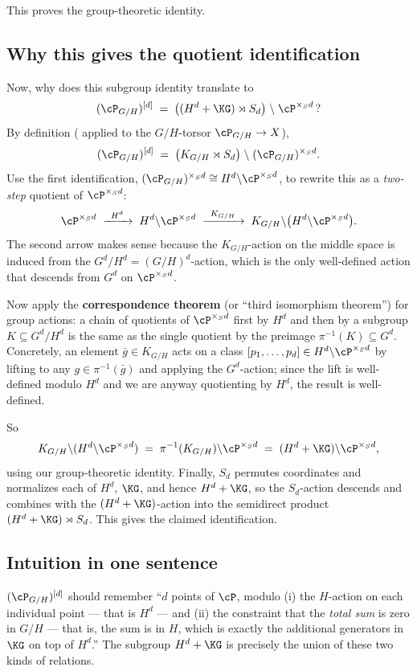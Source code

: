 This proves the group-theoretic identity.

\subsection*{Why this gives the quotient identification}
Now, why does this subgroup identity translate to
\[
(\cP_{G/H})^{[d]} \;=\; \bigl((H^d + \KG) \rtimes S_d\bigr) \;\backslash\; \cP^{\times_S d}\,?
\]
By definition ( applied to the $G/H$-torsor $\cP_{G/H}\to X$),
\[
(\cP_{G/H})^{[d]} \;=\; \bigl(K_{G/H} \rtimes S_d\bigr) \;\backslash\; (\cP_{G/H})^{\times_S d}.
\]
Use the first identification, $(\cP_{G/H})^{\times_S d} \cong H^d \backslash \cP^{\times_S d}$, to rewrite this as a \emph{two-step} quotient of $\cP^{\times_S d}$:
\[
\cP^{\times_S d} \;\xrightarrow{\;\;H^d\;\;}\; H^d \backslash \cP^{\times_S d} \;\xrightarrow{\;\;K_{G/H}\;\;}\; K_{G/H} \backslash \bigl(H^d \backslash \cP^{\times_S d}\bigr).
\]
The second arrow makes sense because the $K_{G/H}$-action on the middle space is induced from the $G^d/H^d = (G/H)^d$-action, which is the only well-defined action that descends from $G^d$ on $\cP^{\times_S d}$.

Now apply the \textbf{correspondence theorem} (or ``third isomorphism theorem'') for group actions: a chain of quotients of $\cP^{\times_S d}$ first by $H^d$ and then by a subgroup $K \subseteq G^d/H^d$ is the same as the single quotient by the preimage $\pi^{-1}(K) \subseteq G^d$. Concretely, an element $\bar g \in K_{G/H}$ acts on a class $[p_1,\dots,p_d] \in H^d \backslash \cP^{\times_S d}$ by lifting to any $g \in \pi^{-1}(\bar g)$ and applying the $G^d$-action; since the lift is well-defined modulo $H^d$ and we are anyway quotienting by $H^d$, the result is well-defined.

So
\[
K_{G/H} \backslash (H^d \backslash \cP^{\times_S d}) \;=\; \pi^{-1}(K_{G/H}) \backslash \cP^{\times_S d} \;=\; (H^d + \KG) \backslash \cP^{\times_S d},
\]
using our group-theoretic identity. Finally, $S_d$ permutes coordinates and normalizes each of $H^d$, $\KG$, and hence $H^d + \KG$, so the $S_d$-action descends and combines with the $(H^d+\KG)$-action into the semidirect product $(H^d + \KG) \rtimes S_d$. This gives the claimed identification.

\subsection*{Intuition in one sentence}
$(\cP_{G/H})^{[d]}$ should remember ``$d$ points of $\cP$, modulo (i) the $H$-action on each individual point --- that is $H^d$ --- and (ii) the constraint that the \emph{total sum} is zero in $G/H$ --- that is, the sum is in $H$, which is exactly the additional generators in $\KG$ on top of $H^d$.'' The subgroup $H^d + \KG$ is precisely the union of these two kinds of relations.


